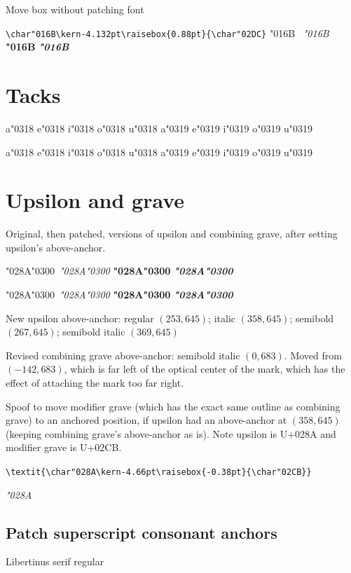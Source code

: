 \documentclass[landscape]{article}
\newcommand{\ribbiline}[1]{#1\ 
	{\itshape #1}
	{\bfseries #1}
	{\itshape\bfseries #1}}
\begin{document}
Move box without patching font

\verb|\char"016B\kern-4.132pt| 
\ribbiline{\char"016B\kern-4.132pt\raisebox{0.88pt}{\char"02DC}
}

\section*{Tacks}

a\char"0318
e\char"0318
i\char"0318
o\char"0318
u\char"0318
a\char"0319
e\char"0319
i\char"0319
o\char"0319
u\char"0319

{\LibertinusSerifPatch
a\char"0318
e\char"0318
i\char"0318
o\char"0318
u\char"0318
a\char"0319
e\char"0319
i\char"0319
o\char"0319
u\char"0319
}

\newpage
\section*{Upsilon and grave}

Original, then patched, versions of upsilon and combining grave,
after setting upsilon's above-anchor.

\ribbiline{\char"028A\char"0300}

{\LibertinusSerifPatch
\ribbiline{\char"028A\char"0300}
}

New upsilon above-anchor: 
regular $(253, 645)$;
italic $(358, 645)$;
semibold $(267, 645)$;
semibold italic $(369, 645)$

Revised combining grave above-anchor: semibold italic $(0, 683)$.
Moved from $(-142, 683)$, which is far left of the optical center of the mark, 
which has the effect of attaching the mark too far right.

Spoof to move modifier grave (which has the exact same outline as combining grave) to an anchored position, 
if upsilon had an above-anchor at $(358, 645)$ (keeping combining grave's above-anchor as is).
Note upsilon is U+028A and modifier grave is U+02CB.

\verb|\textit{\char"028A\kern-4.66pt\raisebox{-0.38pt}{\char"02CB}}| 

\textit{\char"028A\kern-4.66pt}


\newpage
\subsection*{Patch superscript consonant anchors}

Libertinus serif regular
\end{document}
